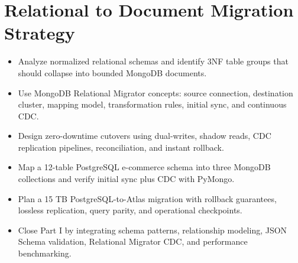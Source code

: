 \chapter{Relational to Document Migration Strategy}
%

\begin{objectives}
\begin{itemize}
    \item Analyze normalized relational schemas and identify 3NF table groups that should collapse into bounded MongoDB documents.
    \item Use MongoDB Relational Migrator concepts: source connection, destination cluster, mapping model, transformation rules, initial sync, and continuous CDC.
    \item Design zero-downtime cutovers using dual-writes, shadow reads, CDC replication pipelines, reconciliation, and instant rollback.
    \item Map a 12-table PostgreSQL e-commerce schema into three MongoDB collections and verify initial sync plus CDC with PyMongo.
    \item Plan a 15 TB PostgreSQL-to-Atlas migration with rollback guarantees, lossless replication, query parity, and operational checkpoints.
    \item Close Part I by integrating schema patterns, relationship modeling, JSON Schema validation, Relational Migrator CDC, and performance benchmarking.
\end{itemize}
\end{objectives}

